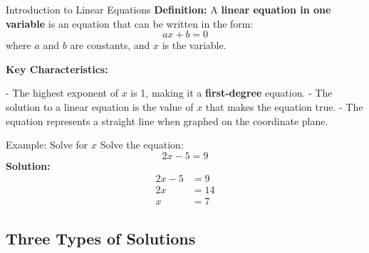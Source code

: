 \documentclass{beamer}
\begin{document}
\begin{frame}{Introduction to Linear Equations}
    \textbf{Definition:} A \textbf{linear equation in one variable} is an equation that can be written in the form:
    \[
    ax + b = 0
    \]
    where \( a \) and \( b \) are constants, and \( x \) is the variable.

    \vspace{0.5cm}
    \textbf{Key Characteristics:}
    
    - The highest exponent of \( x \) is 1, making it a \textbf{first-degree} equation.
    - The solution to a linear equation is the value of \( x \) that makes the equation true.
    - The equation represents a straight line when graphed on the coordinate plane.

    

\end{frame}




\begin{frame}{Example: Solve for \( x \)}
    Solve the equation:
    \[
    2x - 5 = 9
    \]
    \pause
    \textbf{Solution:}
    \begin{align*}
        2x - 5 &= 9 \\
        2x &= 14 \\
        x &= 7
    \end{align*}
\end{frame}

\begin{frame}
\section{Three Types of Solutions}
\end{frame}
\end{document}
